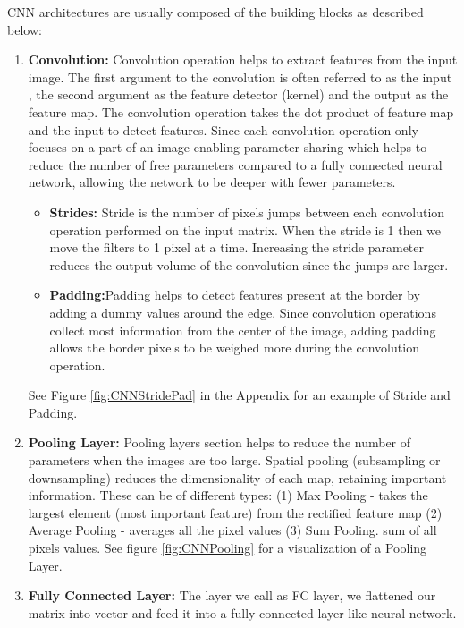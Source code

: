 \documentclass[12pt]{article}
\begin{document}
CNN architectures are usually composed of the building blocks as described
below:

\begin{enumerate}
\item \textbf{Convolution:} Convolution operation helps to extract features
  from the input image. The ﬁrst argument to the convolution is often referred
  to as the input , the second argument as the feature detector (kernel) and
  the output as the feature map. The convolution operation takes the dot
  product of feature map and the input to detect features. Since each
  convolution operation only focuses on a part of an image enabling parameter
  sharing which helps to reduce the number of free parameters compared to a
  fully connected neural network, allowing the network to be deeper with
  fewer parameters.

  \begin{itemize}
  \item \textbf{Strides:} Stride is the number of pixels jumps between
    each convolution operation performed on the input matrix. When the stride
    is 1 then we move the filters to 1 pixel at a time. Increasing the stride
    parameter reduces the output volume of the convolution since the jumps
    are larger.
  \item \textbf{Padding:}Padding helps to detect features present at the
    border by adding a dummy values around the edge. Since convolution
    operations collect most information from the center of the image, adding
    padding allows the border pixels to be weighed more during the convolution
    operation.
  \end{itemize}

  See Figure \ref{fig:CNNStridePad} in the Appendix for an example of Stride
  and Padding.

\item \textbf{Pooling Layer:} Pooling layers section helps to reduce the
  number of parameters when the images are too large. Spatial pooling
  (subsampling or downsampling) reduces the dimensionality of each map,
  retaining important information. These can be of different types:
  (1) Max Pooling - takes the largest element (most important feature)
  from the rectified feature map (2) Average Pooling - averages all the
  pixel values (3) Sum Pooling. sum of all pixels values. See figure
  \ref{fig:CNNPooling} for a visualization of a Pooling Layer.

\item \textbf{Fully Connected Layer:} The layer we call as FC layer, we
  flattened our matrix into vector and feed it into a fully connected layer
  like neural network.
  \end{enumerate}
\end{document}
